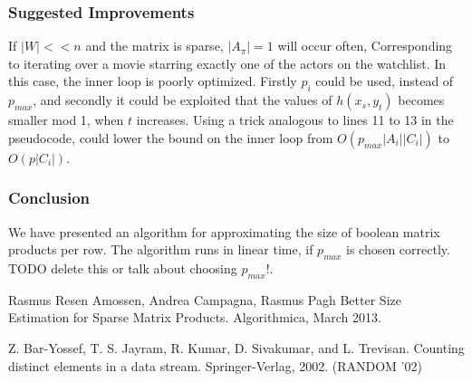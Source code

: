 \documentclass[a4paper,11pt]{article}
\begin{document}




%


\subsubsection{Suggested Improvements}
If $|W|<<n$ and the matrix is sparse, $|A_{\pi}|=1$ will occur often, Corresponding to iterating over a movie starring exactly one of the actors on the watchlist. In this case, the inner loop is poorly optimized. Firstly $p_i$ could be used, instead of $p_{max}$, and secondly it could be exploited that the values of $h(x_s, y_t)$ becomes smaller mod 1, when $t$ increases. Using a trick analogous to lines 11 to 13 in the pseudocode, could lower the bound on the inner loop from $O(p_{max}|A_i||C_i|)$ to $O(p|C_i|)$.



\subsubsection{Conclusion}
We have presented an algorithm for approximating the size of boolean matrix products per row. The algorithm runs in linear time, if $p_{max}$ is chosen correctly. TODO delete this or talk about choosing $p_{max}$!.

\begin{thebibliography}{}
Rasmus Resen Amossen, Andrea Campagna, Rasmus Pagh
Better Size Estimation for Sparse Matrix Products. Algorithmica, March 2013.

Z. Bar-Yossef, T. S. Jayram, R. Kumar, D. Sivakumar, and L. Trevisan.
Counting distinct elements in a data stream. Springer-Verlag, 2002. (RANDOM '02)
\end{thebibliography}
\end{document}
